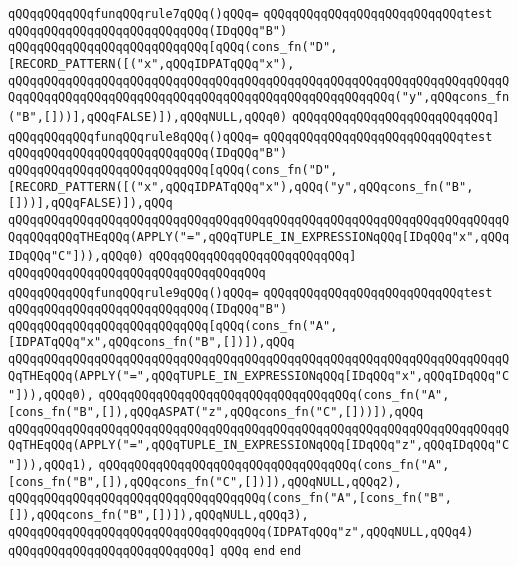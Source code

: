 \verb|qQQqqQQqqQQqfunqQQqrule7qQQq()qQQq=|\newline
\verb|qQQqqQQqqQQqqQQqqQQqqQQqqQQqtest|\newline
\verb|qQQqqQQqqQQqqQQqqQQqqQQqqQQq(IDqQQq"B")|\newline
\verb|qQQqqQQqqQQqqQQqqQQqqQQqqQQq[qQQq(cons_fn("D",[RECORD_PATTERN([("x",qQQqIDPATqQQq"x"),|\newline
\verb|qQQqqQQqqQQqqQQqqQQqqQQqqQQqqQQqqQQqqQQqqQQqqQQqqQQqqQQqqQQqqQQqqQQqqQQqqQQqqQQqqQQqqQQqqQQqqQQqqQQqqQQqqQQqqQQqqQQqqQQqqQQq("y",qQQqcons_fn("B",[]))],qQQqFALSE)]),qQQqNULL,qQQq0)|\newline
\verb|qQQqqQQqqQQqqQQqqQQqqQQqqQQq]|\newline
\newline
\verb|qQQqqQQqqQQqfunqQQqrule8qQQq()qQQq=|\newline
\verb|qQQqqQQqqQQqqQQqqQQqqQQqqQQqtest|\newline
\verb|qQQqqQQqqQQqqQQqqQQqqQQqqQQq(IDqQQq"B")|\newline
\verb|qQQqqQQqqQQqqQQqqQQqqQQqqQQq[qQQq(cons_fn("D",[RECORD_PATTERN([("x",qQQqIDPATqQQq"x"),qQQq("y",qQQqcons_fn("B",[]))],qQQqFALSE)]),qQQq|\newline
\verb|qQQqqQQqqQQqqQQqqQQqqQQqqQQqqQQqqQQqqQQqqQQqqQQqqQQqqQQqqQQqqQQqqQQqqQQqqQQqqQQqTHEqQQq(APPLY("=",qQQqTUPLE_IN_EXPRESSIONqQQq[IDqQQq"x",qQQqIDqQQq"C"])),qQQq0)|\newline
\verb|qQQqqQQqqQQqqQQqqQQqqQQqqQQq]|\newline
\verb|qQQqqQQqqQQqqQQqqQQqqQQqqQQqqQQqqQQq|\newline
\verb|qQQqqQQqqQQqfunqQQqrule9qQQq()qQQq=|\newline
\verb|qQQqqQQqqQQqqQQqqQQqqQQqqQQqtest|\newline
\verb|qQQqqQQqqQQqqQQqqQQqqQQqqQQq(IDqQQq"B")|\newline
\verb|qQQqqQQqqQQqqQQqqQQqqQQqqQQq[qQQq(cons_fn("A",[IDPATqQQq"x",qQQqcons_fn("B",[])]),qQQq|\newline
\verb|qQQqqQQqqQQqqQQqqQQqqQQqqQQqqQQqqQQqqQQqqQQqqQQqqQQqqQQqqQQqqQQqqQQqqQQqTHEqQQq(APPLY("=",qQQqTUPLE_IN_EXPRESSIONqQQq[IDqQQq"x",qQQqIDqQQq"C"])),qQQq0),|\newline
\verb|qQQqqQQqqQQqqQQqqQQqqQQqqQQqqQQqqQQq(cons_fn("A",[cons_fn("B",[]),qQQqASPAT("z",qQQqcons_fn("C",[]))]),qQQq|\newline
\verb|qQQqqQQqqQQqqQQqqQQqqQQqqQQqqQQqqQQqqQQqqQQqqQQqqQQqqQQqqQQqqQQqqQQqqQQqTHEqQQq(APPLY("=",qQQqTUPLE_IN_EXPRESSIONqQQq[IDqQQq"z",qQQqIDqQQq"C"])),qQQq1),|\newline
\verb|qQQqqQQqqQQqqQQqqQQqqQQqqQQqqQQqqQQq(cons_fn("A",[cons_fn("B",[]),qQQqcons_fn("C",[])]),qQQqNULL,qQQq2),|\newline
\verb|qQQqqQQqqQQqqQQqqQQqqQQqqQQqqQQqqQQq(cons_fn("A",[cons_fn("B",[]),qQQqcons_fn("B",[])]),qQQqNULL,qQQq3),|\newline
\verb|qQQqqQQqqQQqqQQqqQQqqQQqqQQqqQQqqQQq(IDPATqQQq"z",qQQqNULL,qQQq4)|\newline
\verb|qQQqqQQqqQQqqQQqqQQqqQQqqQQq]|\newline
\verb|qQQq|\newline
\verb|end|\newline
\verb|end|\newline

